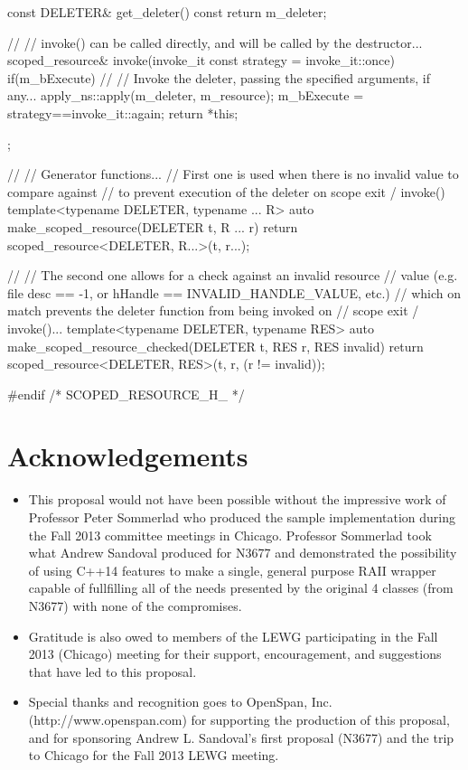 \documentclass[ebook,11pt,article]{memoir}
\begin{document}
\begin{codeblock}
{	const DELETER& get_deleter() const
	{
		return m_deleter;
	}

	//
	// invoke() can be called directly, and will be called by the destructor...
	scoped_resource& invoke(invoke_it const strategy = invoke_it::once)
	{
		if(m_bExecute)
		{
			//
			// Invoke the deleter, passing the specified arguments, if any...
			apply_ns::apply(m_deleter, m_resource);
		}
		m_bExecute = strategy==invoke_it::again;
		return *this;
	}
};

//
// Generator functions...
// First one is used when there is no invalid value to compare against
// to prevent execution of the deleter on scope exit / invoke()
template<typename DELETER, typename ... R>
auto make_scoped_resource(DELETER t, R ... r)
{
	return scoped_resource<DELETER, R...>(t, r...);
}

//
// The second one allows for a check against an invalid resource
// value (e.g. file desc == -1, or hHandle == INVALID_HANDLE_VALUE, etc.)
// which on match prevents the deleter function from being invoked on
// scope exit / invoke()...
template<typename DELETER, typename RES>
auto make_scoped_resource_checked(DELETER t, RES r, RES invalid)
{
	return scoped_resource<DELETER, RES>(t, r, (r != invalid));
}

#endif /* SCOPED_RESOURCE_H_ */
\end{codeblock}

\chapter{Acknowledgements}
\begin{itemize}
\item This proposal would not have been possible without the impressive work of Professor Peter Sommerlad who produced the sample implementation during the Fall 2013 committee meetings in Chicago.  Professor Sommerlad took what Andrew Sandoval produced for N3677 and demonstrated the possibility of using C++14 features to make a single, general purpose RAII wrapper capable of fullfilling all of the needs presented by the original 4 classes (from N3677) with none of the compromises.
\item Gratitude is also owed to members of the LEWG participating in the Fall 2013 (Chicago) meeting for their support, encouragement, and suggestions that have led to this proposal.
\item Special thanks and recognition goes to OpenSpan, Inc. (http://www.openspan.com) for supporting the production of this proposal, and for sponsoring Andrew L. Sandoval's first proposal (N3677) and the trip to Chicago for the Fall 2013 LEWG meeting.
\end{itemize}
\end{document}
